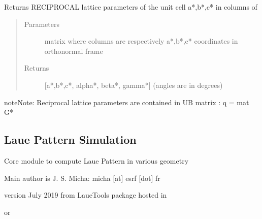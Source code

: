\documentclass[letterpaper,10pt,english]{sphinxmanual}
\begin{document}
\begin{fulllineitems}
\label{\detokenize{Simulation_Module:LaueTools.CrystalParameters.matrix_to_rlat}}
Returns RECIPROCAL lattice parameters of the unit cell a*,b*,c* in columns of 
\begin{quote}\begin{description}
\item[{Parameters}] \leavevmode
{} \textendash{} matrix where columns are respectively a*,b*,c* coordinates in orthonormal frame

\item[{Returns}] \leavevmode
{[}a*,b*,c*, alpha*, beta*, gamma*{]} (angles are in degrees)

\end{description}\end{quote}

\begin{sphinxadmonition}{note}{Note:}
Reciprocal lattice parameters are contained in UB matrix : q =  mat G*
\end{sphinxadmonition}

\end{fulllineitems}



\subsection{Laue Pattern Simulation}
\label{\detokenize{Simulation_Module:laue-pattern-simulation}}\label{\detokenize{Simulation_Module:module-LaueTools.lauecore}}
Core module to compute Laue Pattern in various geometry

Main author is J. S. Micha:   micha {[}at{]} esrf {[}dot{]} fr

version July 2019
from LaueTools package hosted in


or

\end{document}
